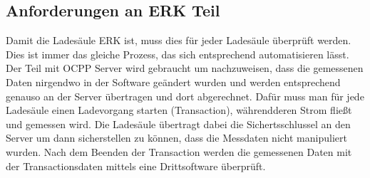 \subsection{Anforderungen an ERK Teil}
    Damit die Ladesäule ERK ist, muss dies für jeder Ladesäule überprüft werden. Dies ist immer das gleiche Prozess, das sich entsprechend automatisieren lässt.
Der Teil mit OCPP Server wird gebraucht um nachzuweisen, dass die gemessenen Daten nirgendwo in der Software geändert wurden und werden entsprechend genauso an der Server übertragen und dort abgerechnet.
Dafür muss man für jede Ladesäule einen Ladevorgang starten (Transaction), währendderen Strom fließt und gemessen wird. Die Ladesäule übertragt dabei die Sichertsschlussel an den Server um dann sicherstellen zu können,
dass die Messdaten nicht manipuliert wurden. Nach dem Beenden der Transaction werden die gemessenen Daten mit der Transactionsdaten mittels eine Drittsoftware überprüft.


